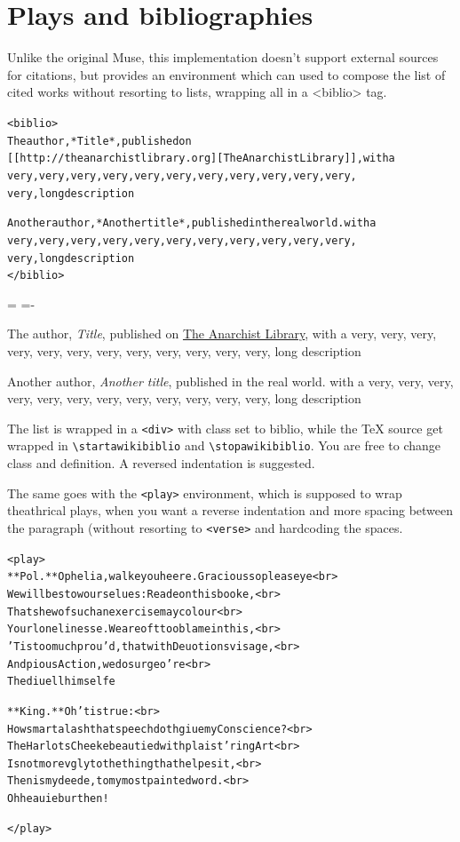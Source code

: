 \documentclass[DIV=12,%
               BCOR=0mm,%
               fontsize=10pt,%
               oneside,%
               paper=210mm:11in]{scrbook}
\newenvironment*{amusebiblio}{
  \leftskip=\parindent
  \parindent=-\parindent
  \smallskip
  \indent
}{\smallskip}
\begin{document}
\chapter{Plays and bibliographies}


Unlike the original Muse, this implementation doesn't support external
sources for citations, but provides an environment which can used to
compose the list of cited works without resorting to lists, wrapping
all in a <biblio> tag.


\begin{alltt}
<biblio>
The author, *Title*, published on
[[http://theanarchistlibrary.org][The Anarchist Library]], with a
very, very, very, very, very, very, very, very, very, very, very,
very, long description

Another author, *Another title*, published in the real world. with a
very, very, very, very, very, very, very, very, very, very, very,
very, long description
</biblio>

\end{alltt}



\begin{amusebiblio}


The author, \emph{Title}, published on
\href{http://theanarchistlibrary.org}{The Anarchist Library}, with a
very, very, very, very, very, very, very, very, very, very, very,
very, long description


Another author, \emph{Another title}, published in the real world. with a
very, very, very, very, very, very, very, very, very, very, very,
very, long description



\end{amusebiblio}


The list is wrapped in a \texttt{<div>} with class set to biblio, while the TeX
source get wrapped in \texttt{\textbackslash{}startawikibiblio} and \texttt{\textbackslash{}stopawikibiblio}. You are
free to change class and definition. A reversed indentation is
suggested.


The same goes with the \texttt{<play>} environment, which is supposed to wrap
theathrical plays, when you want a reverse indentation and more
spacing between the paragraph (without resorting to \texttt{<verse>} and
hardcoding the spaces.


\begin{alltt}
<play>
**Pol.** Ophelia, walke you heere. Gracious so please ye <br>
We will bestow our selues: Reade on this booke, <br>
That shew of such an exercise may colour <br>
Your lonelinesse. We are oft too blame in this, <br>
'Tis too much prou'd, that with Deuotions visage, <br>
And pious Action, we do surge o're <br>
The diuell himselfe

**King.** Oh 'tis true: <br>
How smart a lash that speech doth giue my Conscience? <br>
The Harlots Cheeke beautied with plaist'ring Art <br>
Is not more vgly to the thing that helpes it, <br>
Then is my deede, to my most painted word. <br>
Oh heauie burthen!

</play>

\end{alltt}
\end{document}
